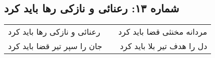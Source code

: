 \begin{center}
\section*{شماره ۱۳: رعنائی و نازکی رها باید کرد}
\label{sec:013}
\begin{longtable}{l p{0.5cm} r}
رعنائی و نازکی رها باید کرد
&&
مردانه مخنثی قضا باید کرد
\\
جان را سپر تیر قضا باید کرد
&&
دل را هدف تیر بلا باید کرد
\\
\end{longtable}
\end{center}
